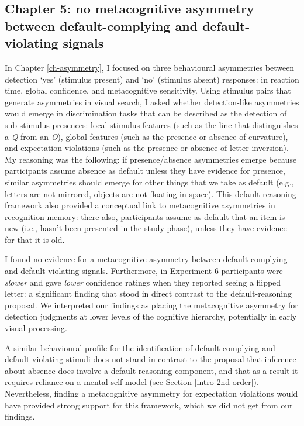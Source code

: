 \documentclass[12pt,twoside]{reedthesis}
\begin{document}
\hypertarget{chapter-5-no-metacognitive-asymmetry-between-default-complying-and-default-violating-signals}{%
\subsection*{Chapter 5: no metacognitive asymmetry between default-complying and default-violating signals}\label{chapter-5-no-metacognitive-asymmetry-between-default-complying-and-default-violating-signals}}

In Chapter \ref{ch-asymmetry}, I focused on three behavioural asymmetries between detection `yes' (stimulus present) and `no' (stimulus absent) responses: in reaction time, global confidence, and metacognitive sensitivity. Using stimulus pairs that generate asymmetries in visual search, I asked whether detection-like asymmetries would emerge in discrimination tasks that can be described as the detection of sub-stimulus presences: local stimulus features (such as the line that distinguishes a \emph{Q} from an \emph{O}), global features (such as the presence or absence of curvature), and expectation violations (such as the presence or absence of letter inversion). My reasoning was the following: if presence/absence asymmetries emerge because participants assume absence as default unless they have evidence for presence, similar asymmetries should emerge for other things that we take as default (e.g., letters are not mirrored, objects are not floating in space). This default-reasoning framework also provided a conceptual link to metacognitive asymmetries in recognition memory: there also, participants assume as default that an item is new (i.e., hasn't been presented in the study phase), unless they have evidence for that it is old.

I found no evidence for a metacognitive asymmetry between default-complying and default-violating signals. Furthermore, in Experiment 6 participants were \emph{slower} and gave \emph{lower} confidence ratings when they reported seeing a flipped letter: a significant finding that stood in direct contrast to the default-reasoning proposal. We interpreted our findings as placing the metacognitive asymmetry for detection judgments at lower levels of the cognitive hierarchy, potentially in early visual processing.

A similar behavioural profile for the identification of default-complying and default violating stimuli does not stand in contrast to the proposal that inference about absence does involve a default-reasoning component, and that as a result it requires reliance on a mental self model (see Section \ref{intro-2nd-order}). Nevertheless, finding a metacognitive asymmetry for expectation violations would have provided strong support for this framework, which we did not get from our findings.
\end{document}
